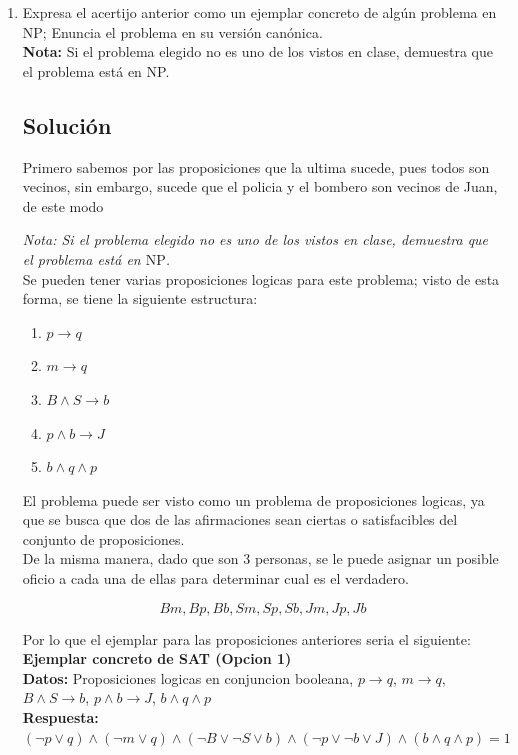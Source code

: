 \begin{enumerate}[label=\arabic*., leftmargin=*]
    \item Expresa el acertijo anterior como un ejemplar concreto de algún problema en NP; Enuncia el problema en su versión canónica. \\
    \textbf{Nota:} Si el problema elegido no es uno de los vistos en clase, demuestra que el problema está en NP.
    
    \subsection*{Solución}
    Primero sabemos por las proposiciones que la ultima sucede, pues todos son vecinos, sin embargo, sucede que el policia y el bombero son vecinos de Juan, de este modo 
    
    \textit{Nota: Si el problema elegido no es uno de los vistos en clase, demuestra que el problema está en $\text{NP}$.}\\

    Se pueden tener varias proposiciones logicas para este problema; visto de esta forma, se tiene la siguiente estructura:
    \begin{enumerate}
        \item $p \rightarrow   q$
        \item $m \rightarrow   q$
        \item $B \wedge S \rightarrow  b$
        \item $p \wedge b \rightarrow  J$
        \item $b \wedge q \wedge p$
    \end{enumerate}

    El problema puede ser visto como un problema de proposiciones logicas, ya que se busca que dos de las afirmaciones sean ciertas o satisfacibles del conjunto de proposiciones.\\

    De la misma manera, dado que son 3 personas, se le puede asignar un posible oficio a cada una de ellas para determinar cual es el verdadero.

    $$Bm,Bp,Bb,Sm,Sp,Sb,Jm,Jp,Jb$$
    
    Por lo que el ejemplar para las proposiciones anteriores seria el siguiente:\\

    \textbf{Ejemplar concreto de SAT (Opcion 1)}\\
    \textbf{Datos:} Proposiciones logicas en conjuncion booleana, $p \rightarrow   q$, $m \rightarrow   q$, $B \wedge S \rightarrow  b$, $p \wedge b \rightarrow  J$, $b \wedge q \wedge p$\\
    \textbf{Respuesta:} $(\neg p \vee q) \wedge (\neg m \vee q) \wedge (\neg B \vee \neg S \vee b) \wedge (\neg p \vee \neg b \vee J) \wedge (b \wedge q \wedge p) = 1$ \\


\end{enumerate}
